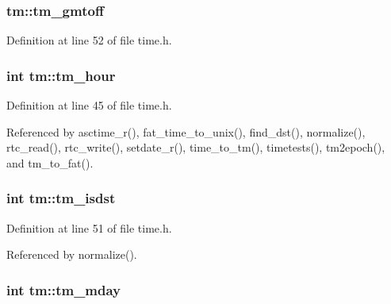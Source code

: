 \subsubsection[{\texorpdfstring{tm\+\_\+gmtoff}{tm_gmtoff}}]{ tm\+::tm\+\_\+gmtoff}\hypertarget{structtm_a6b7d1fb16f21197ea027e364e2812c3d}{}\label{structtm_a6b7d1fb16f21197ea027e364e2812c3d}


Definition at line 52 of file time.\+h.

\subsubsection[{\texorpdfstring{tm\+\_\+hour}{tm_hour}}]{\setlength{\rightskip}{0pt plus 5cm}int tm\+::tm\+\_\+hour}\hypertarget{structtm_a3e7ca4e37f1abcaf56b8a916c38eb9fe}{}\label{structtm_a3e7ca4e37f1abcaf56b8a916c38eb9fe}


Definition at line 45 of file time.\+h.



Referenced by asctime\+\_\+r(), fat\+\_\+time\+\_\+to\+\_\+unix(), find\+\_\+dst(), normalize(), rtc\+\_\+read(), rtc\+\_\+write(), setdate\+\_\+r(), time\+\_\+to\+\_\+tm(), timetests(), tm2epoch(), and tm\+\_\+to\+\_\+fat().

\subsubsection[{\texorpdfstring{tm\+\_\+isdst}{tm_isdst}}]{\setlength{\rightskip}{0pt plus 5cm}int tm\+::tm\+\_\+isdst}\hypertarget{structtm_a5645ca0580c8ab2c24f6c2965d9c9f9c}{}\label{structtm_a5645ca0580c8ab2c24f6c2965d9c9f9c}


Definition at line 51 of file time.\+h.



Referenced by normalize().

\subsubsection[{\texorpdfstring{tm\+\_\+mday}{tm_mday}}]{\setlength{\rightskip}{0pt plus 5cm}int tm\+::tm\+\_\+mday}\hypertarget{structtm_ab8d8904bad43b0c8b96e61941c5b5310}{}\label{structtm_ab8d8904bad43b0c8b96e61941c5b5310}



